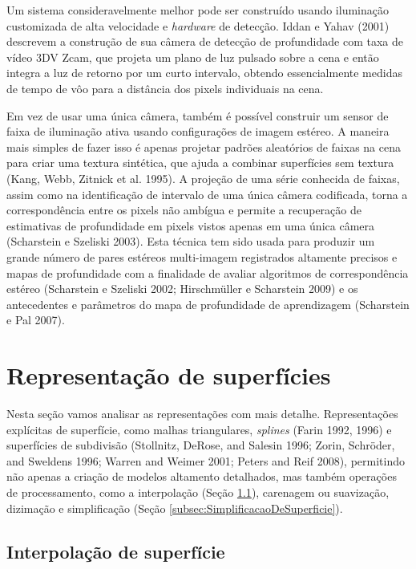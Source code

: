 \documentclass{article}
\begin{document}
Um sistema consideravelmente melhor pode ser construído usando iluminação customizada de alta velocidade e \textit{hardware} de detecção. Iddan e Yahav (2001) descrevem a construção de sua câmera de detecção de profundidade com taxa de vídeo 3DV Zcam, que projeta um plano de luz pulsado sobre a cena e então integra a luz de retorno por um curto intervalo, obtendo essencialmente medidas de tempo de vôo para a distância dos pixels individuais na cena.

Em vez de usar uma única câmera, também é possível construir um sensor de faixa de iluminação ativa usando configurações de imagem estéreo. A maneira mais simples de fazer isso é apenas projetar padrões aleatórios de faixas na cena para criar uma textura sintética, que ajuda a combinar superfícies sem textura (Kang, Webb, Zitnick et al. 1995). A projeção de uma série conhecida de faixas, assim como na identificação de intervalo de uma única câmera codificada, torna a correspondência entre os pixels não ambígua e permite a recuperação de estimativas de profundidade em pixels vistos apenas em uma única câmera (Scharstein e Szeliski 2003). Esta técnica tem sido usada para produzir um grande número de pares estéreos multi-imagem registrados altamente precisos e mapas de profundidade com a finalidade de avaliar algoritmos de correspondência estéreo (Scharstein e Szeliski 2002; Hirschmüller e Scharstein 2009) e os antecedentes e parâmetros do mapa de profundidade de aprendizagem (Scharstein e Pal 2007).



\section{Representação de superfícies}

Nesta seção vamos analisar as representações com mais detalhe. Representações explícitas de superfície, como malhas triangulares, \textit{splines} (Farin 1992, 1996) e superfícies de subdivisão (Stollnitz, DeRose, and Salesin 1996; Zorin, Schröder, and Sweldens 1996; Warren and Weimer 2001; Peters and Reif 2008), permitindo não apenas a criação de modelos altamento detalhados, mas também operações de processamento, como a interpolação (Seção \ref{subsec:InterpolacaoDeSuperficie}), carenagem ou suavização, dizimação e simplificação (Seção \ref{subsec:SimplificacaoDeSuperficie}).

\subsection{Interpolação de superfície}
\label{subsec:InterpolacaoDeSuperficie}
\end{document}
